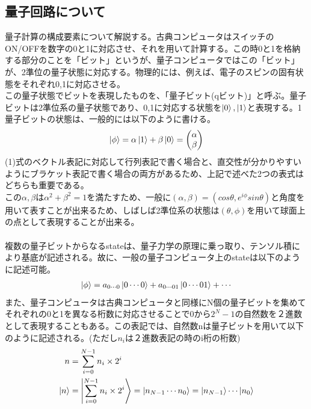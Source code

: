 \documentclass[a4paper,10.5pt]{article}
\numberwithin{equation}{section}
\begin{document}
\subsection{量子回路について}
量子計算の構成要素について解説する。古典コンピュータはスイッチのON/OFFを数字の0と1に対応させ、それを用いて計算する。この時0と1を格納する部分のことを「ビット」というが、量子コンピュータではこの「ビット」が、2準位の量子状態に対応する。物理的には、例えば、電子のスピンの固有状態をそれぞれ0,1に対応させる。\\
この量子状態でビットを表現したものを、「量子ビット(qビット)」と呼ぶ。量子ビットは2準位系の量子状態であり、0,1に対応する状態を$\ket{0},\ket{1}$と表現する。1量子ビットの状態は、一般的には以下のように書ける。
 \begin{equation}\begin{split}
     \ket{\phi} = \alpha \ket{1} + \beta \ket{0}
                =\mqty(\alpha \\ \beta)
 \end{split} \end{equation}
(1)式のベクトル表記に対応して行列表記で書く場合と、直交性が分かりやすいようにブラケット表記で書く場合の両方があるため、上記で述べた2つの表式はどちらも重要である。\\
この$\alpha,\beta$は$\alpha^{2}+\beta^{2}=1$を満たすため、一般に$(\alpha,\beta) = (cos\theta,e^{i\phi}sin\theta)$と角度を用いて表すことが出来るため、しばしば2準位系の状態は$(\theta,\phi)$を用いて球面上の点として表現することが出来る。\\
\\
複数の量子ビットからなるstateは、量子力学の原理に乗っ取り、テンソル積により基底が記述される。故に、一般の量子コンピュータ上のstateは以下のように記述可能。
\begin{equation}\begin{split}
    \ket{\phi}=a_{0\cdots 0}\ket{0\cdots 0}+a_{0\cdots 01}\ket{0\cdots 01}+\cdots
\end{split} \end{equation}
また、量子コンピュータは古典コンピュータと同様にN個の量子ビットを集めてそれぞれの0と1を異なる桁数に対応させることで0から$2^{N}-1$の自然数を２進数として表現することもある。この表記では、自然数nは量子ビットを用いて以下のように記述される。(ただし$n_{i}$は２進数表記の時のi桁の桁数)
\begin{equation}\begin{split}
    n &=\sum_{i=0}^{N-1} n_{i} \times 2^{i}\\ 
    \ket{n} &= \ket{\sum_{i=0}^{N-1} n_{i} \times 2^{i}} 
            = \ket{n_{N-1} \cdots n_{0}}
            = \ket{n_{N-1}} \cdots  \ket{n_{0}}
\end{split} \end{equation}
\end{document}
